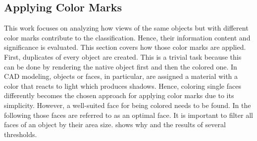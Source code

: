 \subsection{Applying Color Marks}
\label{sec:dataset-material-feature}
This work focuses on analyzing how views of the same objects but with different color marks contribute to the classification.
Hence, their information content and significance is evaluated.
This section covers how those color marks are applied.
First, duplicates of every object are created.
This is a trivial task because this can be done by rendering the native object first and then the colored one.
In CAD modeling, objects or faces, in particular, are assigned a material with a color that reacts to light which produces shadows.
Hence, coloring single faces differently becomes the chosen approach for applying color marks due to its simplicity.
However, a well-suited face for being colored needs to be found.
In the following those faces are referred to as an optimal face.
It is important to filter all faces of an object by their area size.
 shows why and the results of several thresholds.
